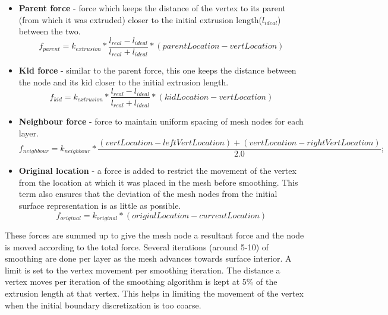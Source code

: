 \documentclass[conf]{new-aiaa}
\begin{document}
\begin{itemize}
\item \textbf{Parent force} - force which keeps the distance of the vertex to its parent (from which it was extruded) closer to the initial extrusion length($l_{ideal}$) between the two.
\begin{equation}
f_{parent} = k_{extrusion} * \frac{l_{real} - l_{ideal}}{l_{real} + l_{ideal}} * (parentLocation - vertLocation)
\end{equation}
\item \textbf{Kid force} - similar to the parent force, this one keeps the distance between the node and its kid closer to the initial extrusion length.
\begin{equation}
f_{kid} = k_{extrusion} * \frac{l_{real} - l_{ideal}}{l_{real} + l_{ideal}} * (kidLocation - vertLocation)
\end{equation}
\item \textbf{Neighbour force} - force to maintain uniform spacing of mesh nodes for each layer.
\begin{equation}
f_{neighbour} = k_{neighbour} * \frac{(vertLocation - leftVertLocation) + (vertLocation - rightVertLocation)}{ 2.0};
\end{equation}
\item \textbf{Original location} - a force is added to restrict the movement of the vertex from the location at which it was placed in the mesh before smoothing. This term also ensures that the deviation of the mesh nodes from the initial surface representation is as little as possible.
\begin{equation}
f_{original} = k_{original} * (origialLocation - currentLocation)
\end{equation}
\begin{equation}
\end{equation}
\end{itemize}

These forces are summed up to give the mesh node a resultant force and the node is moved according to the total force. Several iterations (around 5-10) of smoothing are done per layer as the mesh advances towards surface interior. A limit is set to the vertex movement per smoothing iteration. The distance a vertex moves per iteration of the smoothing algorithm is kept at $5\%$ of the extrusion length at that vertex. This helps in limiting the movement of the vertex when the initial boundary discretization is too coarse.
\end{document}
